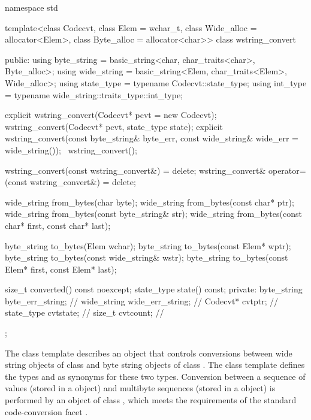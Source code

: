 %
\begin{codeblock}
namespace std {
template<class Codecvt, class Elem = wchar_t,
    class Wide_alloc = allocator<Elem>,
    class Byte_alloc = allocator<char>> class wstring_convert {
  public:
    using byte_string = basic_string<char, char_traits<char>, Byte_alloc>;
    using wide_string = basic_string<Elem, char_traits<Elem>, Wide_alloc>;
    using state_type  = typename Codecvt::state_type;
    using int_type    = typename wide_string::traits_type::int_type;

    explicit wstring_convert(Codecvt* pcvt = new Codecvt);
    wstring_convert(Codecvt* pcvt, state_type state);
    explicit wstring_convert(const byte_string& byte_err,
                             const wide_string& wide_err = wide_string());
    ~wstring_convert();

    wstring_convert(const wstring_convert&) = delete;
    wstring_convert& operator=(const wstring_convert&) = delete;

    wide_string from_bytes(char byte);
    wide_string from_bytes(const char* ptr);
    wide_string from_bytes(const byte_string& str);
    wide_string from_bytes(const char* first, const char* last);

    byte_string to_bytes(Elem wchar);
    byte_string to_bytes(const Elem* wptr);
    byte_string to_bytes(const wide_string& wstr);
    byte_string to_bytes(const Elem* first, const Elem* last);

    size_t converted() const noexcept;
    state_type state() const;
  private:
    byte_string byte_err_string;    // \expos
    wide_string wide_err_string;    // \expos
    Codecvt* cvtptr;                // \expos
    state_type cvtstate;            // \expos
    size_t cvtcount;                // \expos
  };
}
\end{codeblock}

\pnum
The class template describes an object that controls conversions between wide
string objects of class  and byte string objects of class . The class template defines the types
 and  as synonyms for these two types.
Conversion between a sequence of  values (stored in a
 object) and multibyte sequences (stored in a
 object) is performed by an object of class
, which meets the
requirements of the standard code-conversion facet .

